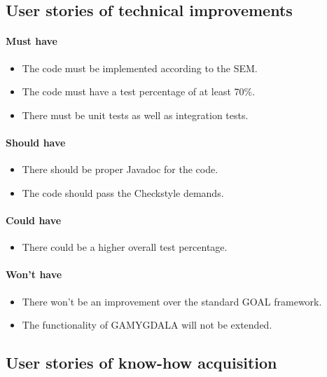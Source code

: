 \subsection{User stories of technical improvements}
\paragraph{Must have} 
\begin{itemize}
\item The code must be implemented according to the \gls{SEM}.
\item The code must have a test percentage of at least 70\%.
\item There must be unit tests as well as integration tests.
\end{itemize}

\paragraph{Should have} 
\begin{itemize}
\item There should be proper Javadoc for the code.
\item The code should pass the \gls{Checkstyle} demands.
\end{itemize}

\paragraph{Could have} 
\begin{itemize}
\item There could be a higher overall test percentage.
\end{itemize}

\paragraph{Won't have} 
\begin{itemize}
\item There won't be an improvement over the standard \gls{GOAL} framework.
\item The functionality of \gls{GAMYGDALA} will not be extended.
\end{itemize}

\subsection{User stories of know-how acquisition}
